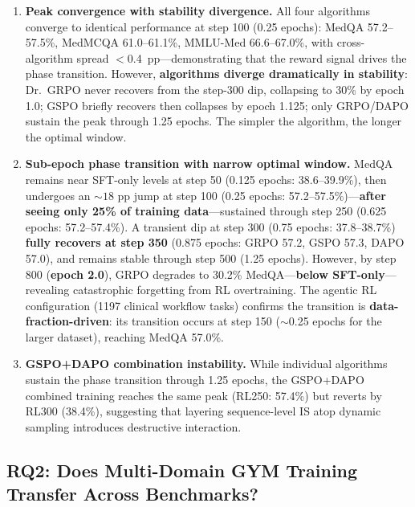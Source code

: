 \documentclass{article}
\begin{document}
\begin{enumerate}[nosep, leftmargin=*]
    \item \textbf{Peak convergence with stability divergence.} All four algorithms converge to identical performance at step 100 (0.25 epochs): MedQA 57.2--57.5\%, MedMCQA 61.0--61.1\%, MMLU-Med 66.6--67.0\%, with cross-algorithm spread $<$0.4~pp---demonstrating that the reward signal drives the phase transition. However, \textbf{algorithms diverge dramatically in stability}: Dr.~GRPO never recovers from the step-300 dip, collapsing to 30\% by epoch 1.0; GSPO briefly recovers then collapses by epoch 1.125; only GRPO/DAPO sustain the peak through 1.25 epochs. The simpler the algorithm, the longer the optimal window.
    \item \textbf{Sub-epoch phase transition with narrow optimal window.} MedQA remains near SFT-only levels at step 50 (0.125 epochs: 38.6--39.9\%), then undergoes an ${\sim}18$ pp jump at step 100 (0.25 epochs: 57.2--57.5\%)---\textbf{after seeing only 25\% of training data}---sustained through step 250 (0.625 epochs: 57.2--57.4\%). A transient dip at step 300 (0.75 epochs: 37.8--38.7\%) \textbf{fully recovers at step 350} (0.875 epochs: GRPO 57.2, GSPO 57.3, DAPO 57.0), and remains stable through step 500 (1.25 epochs). However, by step 800 (\textbf{epoch 2.0}), GRPO degrades to 30.2\% MedQA---\textbf{below SFT-only}---revealing catastrophic forgetting from RL overtraining. The agentic RL configuration (1197 clinical workflow tasks) confirms the transition is \textbf{data-fraction-driven}: its transition occurs at step 150 (${\sim}$0.25 epochs for the larger dataset), reaching MedQA 57.0\%.
    \item \textbf{GSPO+DAPO combination instability.} While individual algorithms sustain the phase transition through 1.25 epochs, the GSPO+DAPO combined training reaches the same peak (RL250: 57.4\%) but reverts by RL300 (38.4\%), suggesting that layering sequence-level IS atop dynamic sampling introduces destructive interaction.
\end{enumerate}

\subsection{RQ2: Does Multi-Domain GYM Training Transfer Across Benchmarks?}
\label{sec:rq2}
\end{document}
